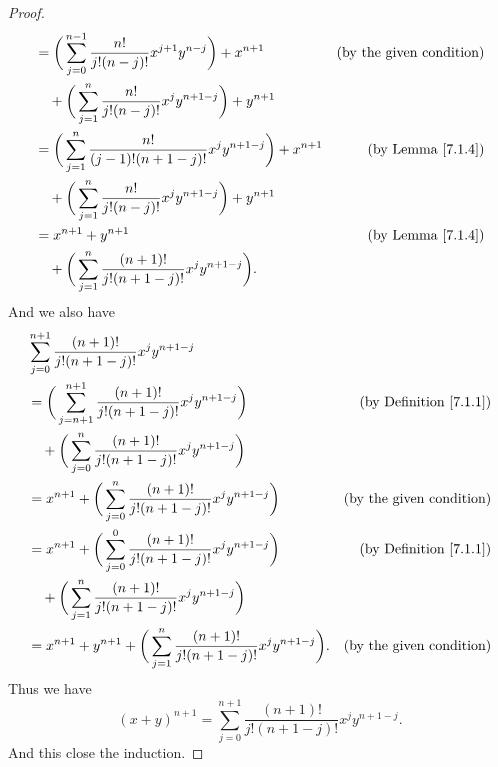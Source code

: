 \begin{proof}
\begin{align*}
                        & = \bigg(\sum_{j = 0}^{n - 1} \frac{n!}{j!(n - j)!} x^{j + 1} y^{n - j}\bigg) + x^{n + 1}   & \text{(by the given condition)}    \\
                        & \quad + \bigg(\sum_{j = 1}^n \frac{n!}{j!(n - j)!} x^j y^{n + 1 - j}\bigg) + y^{n + 1}                                          \\
                        & = \bigg(\sum_{j = 1}^n \frac{n!}{(j - 1)!(n + 1 - j)!} x^j y^{n + 1 - j}\bigg) + x^{n + 1} & \text{(by Lemma \ref{7.1.4})}      \\
                        & \quad + \bigg(\sum_{j = 1}^n \frac{n!}{j!(n - j)!} x^j y^{n + 1 - j}\bigg) + y^{n + 1}                                          \\
                        & = x^{n + 1} + y^{n + 1}                                                                    & \text{(by Lemma \ref{7.1.4})}      \\
                        & \quad + \bigg(\sum_{j = 1}^n \frac{(n + 1)!}{j!(n + 1 - j)!} x^j y^{n + 1 - j}\bigg).
    \end{align*}
    And we also have
    \begin{align*}
         & \sum_{j = 0}^{n + 1} \frac{(n + 1)!}{j!(n + 1 - j)!} x^j y^{n + 1 - j}                                                                       \\
         & = \bigg(\sum_{j = n + 1}^{n + 1} \frac{(n + 1)!}{j!(n + 1 - j)!} x^j y^{n + 1 - j}\bigg)                & \text{(by Definition \ref{7.1.1})} \\
         & \quad + \bigg(\sum_{j = 0}^n \frac{(n + 1)!}{j!(n + 1 - j)!} x^j y^{n + 1 - j}\bigg)                                                         \\
         & = x^{n + 1} + \bigg(\sum_{j = 0}^n \frac{(n + 1)!}{j!(n + 1 - j)!} x^j y^{n + 1 - j}\bigg)              & \text{(by the given condition)}    \\
         & = x^{n + 1} + \bigg(\sum_{j = 0}^0 \frac{(n + 1)!}{j!(n + 1 - j)!} x^j y^{n + 1 - j}\bigg)              & \text{(by Definition \ref{7.1.1})} \\
         & \quad + \bigg(\sum_{j = 1}^n \frac{(n + 1)!}{j!(n + 1 - j)!} x^j y^{n + 1 - j}\bigg)                                                         \\
         & = x^{n + 1} + y^{n + 1} + \bigg(\sum_{j = 1}^n \frac{(n + 1)!}{j!(n + 1 - j)!} x^j y^{n + 1 - j}\bigg). & \text{(by the given condition)}
    \end{align*}
    Thus we have
    \[
        (x + y)^{n + 1} = \sum_{j = 0}^{n + 1} \frac{(n + 1)!}{j!(n + 1 - j)!} x^j y^{n + 1 - j}.
    \]
    And this close the induction.
\end{proof}

